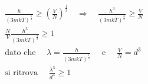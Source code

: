 \begin{equation}
\begin{split}
& \frac{ h}{(3mkT)^{ \frac{ 1}{2}}} \ge (\frac{ V}{N})^{ \frac{ 1}{3}} \quad \Rightarrow \quad \frac{ h^3}{(3mkT)^{ \frac{ 3}{2}}} \ge \frac{ V}{N} \\
& \frac{ N}{V} \frac{ h^3}{(3mkT)^{ \frac{ 3}{2}}} \ge 1 \\
& \mbox{dato che } \quad \lambda = \frac{ h}{(3mkT)^{ \frac{ 1}{2}}} \quad \mbox{ e } \quad \frac{ V}{N} = d^3 \\
& \mbox{si ritrova } \quad \frac{ \lambda^3}{d^3} \ge 1
\end{split}
\end{equation}



